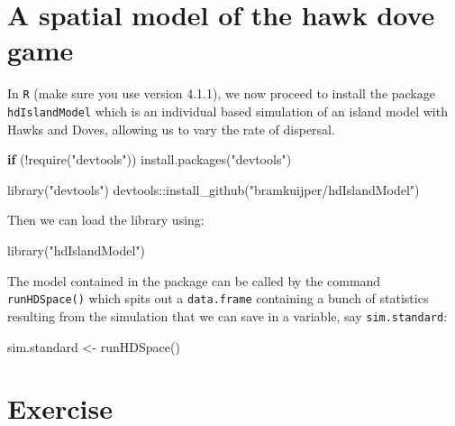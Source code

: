 \documentclass[
]{book}
\newenvironment{Shaded}{\begin{snugshade}}{\end{snugshade}}
\newcommand{\ControlFlowTok}[1]{\textcolor[rgb]{0.13,0.29,0.53}{\textbf{#1}}}
\newcommand{\FunctionTok}[1]{\textcolor[rgb]{0.00,0.00,0.00}{#1}}
\newcommand{\NormalTok}[1]{#1}
\newcommand{\OtherTok}[1]{\textcolor[rgb]{0.56,0.35,0.01}{#1}}
\newcommand{\SpecialCharTok}[1]{\textcolor[rgb]{0.00,0.00,0.00}{#1}}
\newcommand{\StringTok}[1]{\textcolor[rgb]{0.31,0.60,0.02}{#1}}
\begin{document}
\hypertarget{a-spatial-model-of-the-hawk-dove-game}{%
\section{A spatial model of the hawk dove game}\label{a-spatial-model-of-the-hawk-dove-game}}

In \texttt{R} (make sure you use version 4.1.1), we now proceed to install the package \texttt{hdIslandModel} which is an individual based simulation of an island model with Hawks and Doves, allowing us to vary the rate of dispersal.

\begin{Shaded}
\begin{Highlighting}[]
\ControlFlowTok{if}\NormalTok{ (}\SpecialCharTok{!}\FunctionTok{require}\NormalTok{(}\StringTok{"devtools"}\NormalTok{)) }\FunctionTok{install.packages}\NormalTok{(}\StringTok{"devtools"}\NormalTok{)}

\FunctionTok{library}\NormalTok{(}\StringTok{"devtools"}\NormalTok{)}
\NormalTok{devtools}\SpecialCharTok{::}\FunctionTok{install\_github}\NormalTok{(}\StringTok{"bramkuijper/hdIslandModel"}\NormalTok{)}
\end{Highlighting}
\end{Shaded}

Then we can load the library using:

\begin{Shaded}
\begin{Highlighting}[]
\FunctionTok{library}\NormalTok{(}\StringTok{"hdIslandModel"}\NormalTok{)}
\end{Highlighting}
\end{Shaded}

The model contained in the package can be called by the command \texttt{runHDSpace()} which spits out a \texttt{data.frame} containing a bunch of statistics resulting from the simulation that we can save in a variable, say \texttt{sim.standard}:

\begin{Shaded}
\begin{Highlighting}[]
\NormalTok{sim.standard }\OtherTok{\textless{}{-}} \FunctionTok{runHDSpace}\NormalTok{() }
\end{Highlighting}
\end{Shaded}

\hypertarget{exercise-8}{%
\section{Exercise}\label{exercise-8}}
\end{document}

